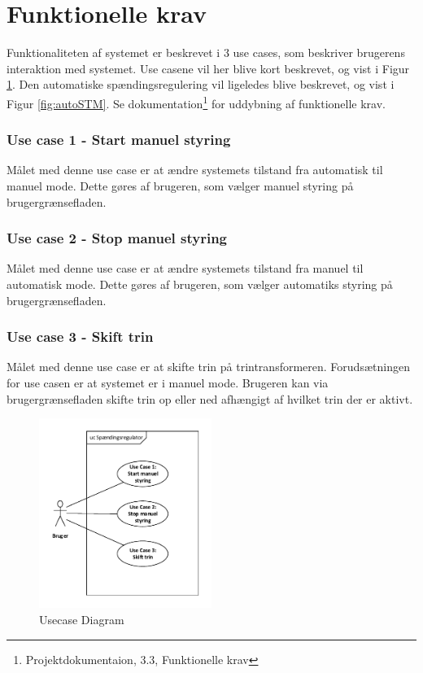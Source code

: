 
\section{Funktionelle krav}

Funktionaliteten af systemet er beskrevet i 3 use cases, som beskriver brugerens interaktion med systemet. Use casene vil her blive kort beskrevet, og vist i Figur \ref{fig:UsecaseDiagram}.
 Den automatiske spændingsregulering vil ligeledes blive beskrevet, og vist i Figur \ref{fig:autoSTM}.
  Se dokumentation\footnote{Projektdokumentaion, 3.3, Funktionelle krav} for uddybning af funktionelle krav. 

\subsubsection{Use case 1 - Start manuel styring}
Målet med denne use case er at ændre systemets tilstand fra automatisk til manuel mode. Dette gøres af brugeren, som vælger manuel styring på brugergrænsefladen. 

\subsubsection{Use case 2 - Stop manuel styring}
Målet med denne use case er at ændre systemets tilstand fra manuel til automatisk mode. Dette gøres af brugeren, som vælger automatiks styring på brugergrænsefladen. 

\subsubsection{Use case 3 - Skift trin}
Målet med denne use case er at skifte trin på trintransformeren. Forudsætningen for use casen er at systemet er i manuel mode. Brugeren kan via brugergrænsefladen skifte trin op eller ned afhængigt af hvilket trin der er aktivt. 

\begin{figure}[H] %
	\centering
	\includegraphics[width=0.5\textwidth]{figure/UsecaseDiagram}
	\caption{Usecase Diagram}
	\label{fig:UsecaseDiagram}
\end{figure}

